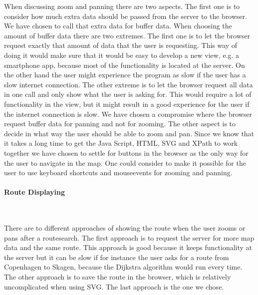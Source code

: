 \documentclass[a4paper,10pt,titlepage]{article}
\begin{document}
When discussing zoom and panning there are two aspects. The first one is to consider how much extra data should be passed from the server to the browser. We have chosen to call that extra data for buffer data. When choosing the amount of buffer data there are two extremes. The first one is to let the browser request exactly that amount of data that the user is requesting. This way of doing it would make sure that it would be easy to develop a new view, e.g. a smartphone app, because most of the functionality is located at the server. On the other hand the user might experience the program as slow if the user has a slow internet connection. The other extreme is to let the browser request all data in one call and only show what the user is asking for. This would require a lot of functionality in the view, but it might result in a good experience for the user if the internet connection is slow. We have chosen a compromise where the browser request buffer data for panning and not for zooming.
The other aspect is to decide in what way the user should be able to zoom and pan. Since we know that it takes a long time to get the Java Script, HTML, SVG and XPath to work together we have chosen to settle for buttons in the browser as the only way for the user to navigate in the map. One could consider to make it possible for the user to use keyboard shortcuts and mouseevents for zooming and panning. 

\paragraph{Route Displaying}\mbox{}\

There are to different approaches of showing the route when the user zooms or pans after a routesearch. The first approach is to request the server for more map data and the same route. This approach is good because it keeps functionality at the server but it can be slow if for instance the user asks for a route from Copenhagen to Skagen, because the Dijkstra algorithm would run every time. The other approach is to save the route in the browser, which is relatively uncomplicated when using SVG. The last approach is the one we chose.	

				
				
\end{document}
